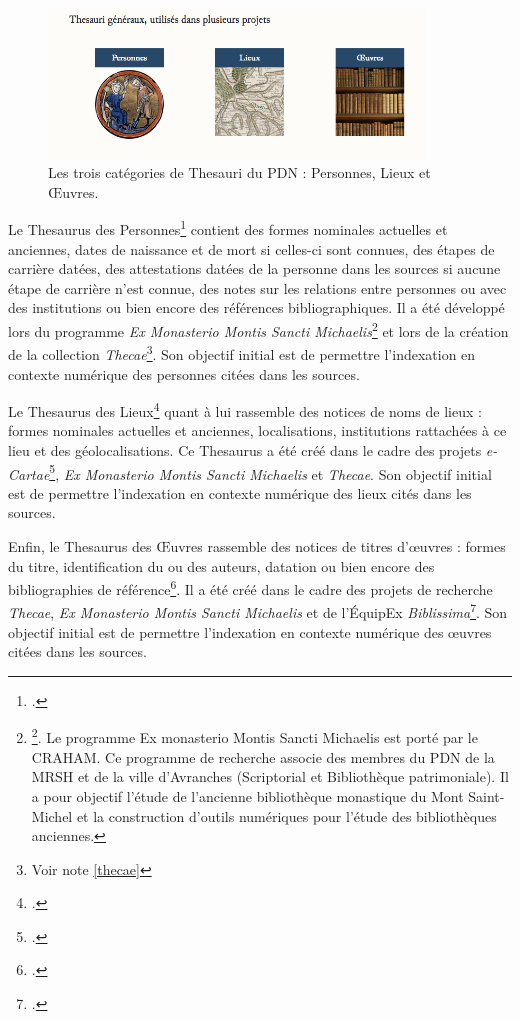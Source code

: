 \documentclass[a4paper,12pt,twoside]{book}
\begin{document}
\begin{figure}[H]
    \centering
    \includegraphics[width=10cm]{img/thesauris/thesau_generaux.png}
    \caption[Les trois catégories de Thesauri du \acrshort{PDN} : Personnes, Lieux et \OE{}uvres]{Les trois catégories de Thesauri du \acrshort{PDN} : Personnes, Lieux et \OE{}uvres.\footnotemark}
\end{figure}


Le Thesaurus des Personnes\footcite{thesau_pers} contient des \og formes nominales actuelles et anciennes, dates de naissance et de mort si celles-ci sont connues, des étapes de carrière datées, des attestations datées de la personne dans les sources si aucune étape de carrière n'est connue, des notes sur les relations entre personnes ou avec des institutions ou bien encore des références bibliographiques\fg. Il a été développé lors du programme \textit{Ex Monasterio Montis Sancti Michaelis}\footnote{\footcite{monasterio}. Le programme Ex monasterio Montis Sancti Michaelis est porté par le CRAHAM. Ce programme de recherche associe des membres du \acrshort{PDN} de la \acrshort{MRSH} et de la ville d'Avranches (Scriptorial et Bibliothèque patrimoniale). Il a pour objectif l'étude de l'ancienne bibliothèque monastique du Mont Saint-Michel et la construction d'outils numériques pour l'étude des bibliothèques anciennes.} et lors de la création de la collection \textit{Thecae}\footnote{Voir note \ref{thecae}}. Son objectif initial est de permettre l'indexation en contexte numérique des personnes citées dans les sources.


Le Thesaurus des Lieux\footcite{thesau_lieu} quant à lui rassemble \og des notices de noms de lieux : formes nominales actuelles et anciennes, localisations, institutions rattachées à ce lieu et des géolocalisations\fg. Ce Thesaurus a été créé dans le cadre des projets \textit{e-Cartae}\footcite{ecartae}, \textit{Ex Monasterio Montis Sancti Michaelis} et \textit{Thecae}. Son objectif initial est de permettre l'indexation en contexte numérique des lieux cités dans les sources.

Enfin, le Thesaurus des \OE{}uvres rassemble \og des notices de titres d'\oe{}uvres : formes du titre, identification du ou des auteurs, datation ou bien encore des bibliographies de référence\fg\footcite{thesau_oeuvre}. Il a été créé dans le cadre des projets de recherche \textit{Thecae}, \textit{Ex Monasterio Montis Sancti Michaelis} et de l'ÉquipEx \textit{Biblissima}\footcite{Biblissima}. Son objectif initial est de permettre l'indexation en contexte numérique des \oe{}uvres citées dans les sources.
\end{document}
